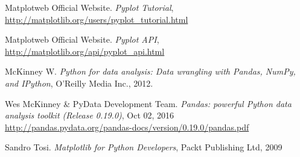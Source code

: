 \documentclass{report}
\begin{document}
\begin{thebibliography}{9}
 Matplotweb Official Website. 
  \newblock \emph{Pyplot Tutorial}, \\ \url{http://matplotlib.org/users/pyplot_tutorial.html}

 Matplotweb Official Website. 
  \newblock \emph{Pyplot API}, \\  
  \url{http://matplotlib.org/api/pyplot_api.html}

 McKinney W. 
  \newblock \emph{Python for data analysis: Data wrangling with Pandas, NumPy, and IPython}, 
  \newblock O'Reilly Media Inc., 2012.

 Wes McKinney \& PyData Development Team. 
  \newblock \emph{Pandas: powerful Python data analysis toolkit (Release 0.19.0)}, 
  \newblock Oct 02, 2016 \\
  \url{http://pandas.pydata.org/pandas-docs/version/0.19.0/pandas.pdf}

 Sandro Tosi.
  \newblock \emph{Matplotlib for Python Developers},
  \newblock Packt Publishing Ltd, 2009
\end{thebibliography}
\end{document}
